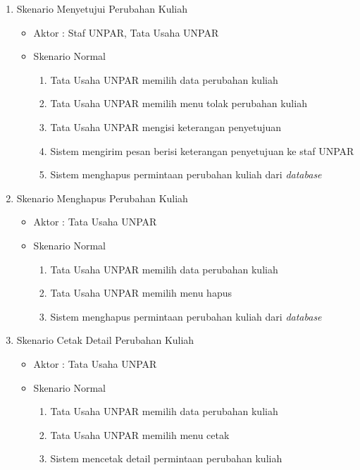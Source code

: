 \begin{enumerate}
	\item Skenario Menyetujui Perubahan Kuliah 
	\begin{itemize}
		\item Aktor : Staf UNPAR, Tata Usaha UNPAR
		\item Skenario Normal
			\begin{enumerate}[1.]
				\item Tata Usaha UNPAR memilih data perubahan kuliah 
				\item Tata Usaha UNPAR memilih menu tolak perubahan kuliah
				\item Tata Usaha UNPAR mengisi keterangan penyetujuan
				\item Sistem mengirim pesan berisi keterangan penyetujuan ke staf UNPAR
				\item Sistem menghapus permintaan perubahan kuliah dari \textit{database}
			\end{enumerate}
	\end{itemize}
	
	\item Skenario Menghapus Perubahan Kuliah 
	\begin{itemize}
		\item Aktor : Tata Usaha UNPAR
		\item Skenario Normal
			\begin{enumerate}[1.]
				\item Tata Usaha UNPAR memilih data perubahan kuliah 
				\item Tata Usaha UNPAR memilih menu hapus
				\item Sistem menghapus permintaan perubahan kuliah dari \textit{database}
			\end{enumerate}
	\end{itemize}

\item Skenario Cetak Detail Perubahan Kuliah 
	\begin{itemize}
		\item Aktor : Tata Usaha UNPAR
		\item Skenario Normal
			\begin{enumerate}[1.]
				\item Tata Usaha UNPAR memilih data perubahan kuliah 
				\item Tata Usaha UNPAR memilih menu cetak
				\item Sistem mencetak detail permintaan perubahan kuliah
			\end{enumerate}
	\end{itemize}


\end{enumerate}
